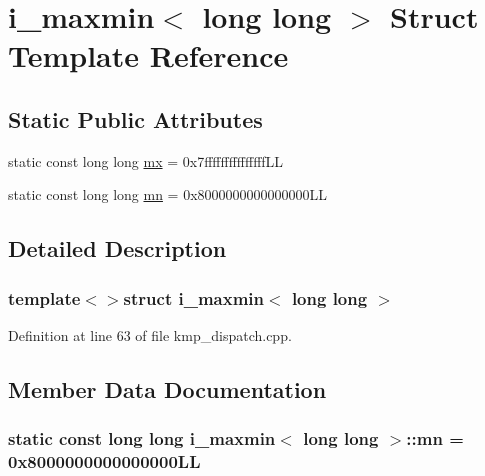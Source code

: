 \hypertarget{structi__maxmin_3_01long_01long_01_4}{\section{i\-\_\-maxmin$<$ long long $>$ Struct Template Reference}
\label{structi__maxmin_3_01long_01long_01_4}
}
\subsection*{Static Public Attributes}
\begin{DoxyCompactItemize}
\item 
static const long long \hyperlink{structi__maxmin_3_01long_01long_01_4_ad4c05907e6730cde0dfa4c5fde1d8103}{mx} = 0x7fffffffffffffff\-L\-L
\item 
static const long long \hyperlink{structi__maxmin_3_01long_01long_01_4_a58e249ac73f0eeead877aa01194dc58e}{mn} = 0x8000000000000000\-L\-L
\end{DoxyCompactItemize}


\subsection{Detailed Description}
\subsubsection*{template$<$$>$struct i\-\_\-maxmin$<$ long long $>$}



Definition at line 63 of file kmp\-\_\-dispatch.\-cpp.



\subsection{Member Data Documentation}
\hypertarget{structi__maxmin_3_01long_01long_01_4_a58e249ac73f0eeead877aa01194dc58e}{
\subsubsection[{mn}]{\setlength{\rightskip}{0pt plus 5cm}static const long long {\bf i\-\_\-maxmin}$<$ long long $>$\-::mn = 0x8000000000000000\-L\-L\hspace{0.3cm}{\ttfamily [static]}}}\label{structi__maxmin_3_01long_01long_01_4_a58e249ac73f0eeead877aa01194dc58e}


